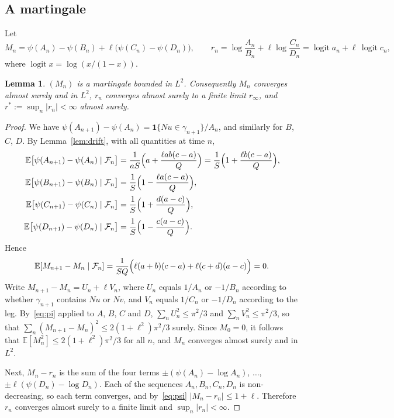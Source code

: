 \documentclass[11pt]{amsart}
\newtheorem{lemma}[theorem]{Lemma}
\theoremstyle{remark}
\newcommand{\EE}{\mathbb{E}}
\newcommand{\cF}{\mathcal{F}}
\newcommand{\one}{\mathbf{1}}
\newcommand{\logit}{\operatorname{logit}}
\begin{document}
\subsection{A martingale}\label{sec:mart}
Let
\[
M_n=\psi(A_n)-\psi(B_n)+\ell\bigl(\psi(C_n)-\psi(D_n)\bigr),\qquad
r_n=\log\frac{A_n}{B_n}+\ell\log\frac{C_n}{D_n}=\logit a_n+\ell\,\logit c_n,
\]
where $\logit x=\log(x/(1-x))$.

\begin{lemma}\label{lem:mart}
$(M_n)$ is a martingale bounded in $L^2$. Consequently $M_n$ converges almost surely and in $L^2$, $r_n$ converges
almost surely to a finite limit $r_\infty$, and $r^*:=\sup_n|r_n|<\infty$ almost surely.
\end{lemma}
\begin{proof}
We have $\psi(A_{n+1})-\psi(A_n)=\one\{Nu\in\gamma_{n+1}\}/A_n$, and similarly for $B$, $C$, $D$. By
Lemma~\ref{lem:drift}, with all quantities at time $n$,
\begin{align*}
\EE\bigl[\psi(A_{n+1})-\psi(A_n)\mid\cF_n\bigr]&=\frac{1}{aS}\Bigl(a+\frac{\ell ab(c-a)}{Q}\Bigr)
=\frac1S\Bigl(1+\frac{\ell b(c-a)}{Q}\Bigr),\\
\EE\bigl[\psi(B_{n+1})-\psi(B_n)\mid\cF_n\bigr]&=\frac1S\Bigl(1-\frac{\ell a(c-a)}{Q}\Bigr),\\
\EE\bigl[\psi(C_{n+1})-\psi(C_n)\mid\cF_n\bigr]&=\frac1S\Bigl(1+\frac{d(a-c)}{Q}\Bigr),\\
\EE\bigl[\psi(D_{n+1})-\psi(D_n)\mid\cF_n\bigr]&=\frac1S\Bigl(1-\frac{c(a-c)}{Q}\Bigr).
\end{align*}
Hence
\[
\EE[M_{n+1}-M_n\mid\cF_n]=\frac{1}{SQ}\Bigl(\ell(a+b)(c-a)+\ell(c+d)(a-c)\Bigr)=0 .
\]
Write $M_{n+1}-M_n=U_n+\ell V_n$, where $U_n$ equals $1/A_n$ or $-1/B_n$ according to whether $\gamma_{n+1}$ contains
$Nu$ or $Nv$, and $V_n$ equals $1/C_n$ or $-1/D_n$ according to the leg. By~\eqref{eq:pi} applied to $A$, $B$, $C$ and
$D$, $\sum_nU_n^2\le\pi^2/3$ and $\sum_nV_n^2\le\pi^2/3$, so that $\sum_n(M_{n+1}-M_n)^2\le2(1+\ell^2)\pi^2/3$ surely.
Since $M_0=0$, it follows that $\EE[M_n^2]\le2(1+\ell^2)\pi^2/3$ for all $n$, and $M_n$ converges almost surely and in
$L^2$.

Next, $M_n-r_n$ is the sum of the four terms $\pm(\psi(A_n)-\log A_n)$, $\dots$, $\pm\ell(\psi(D_n)-\log D_n)$. Each
of the sequences $A_n,B_n,C_n,D_n$ is non-decreasing, so each term converges, and by~\eqref{eq:psi}
$|M_n-r_n|\le1+\ell$. Therefore $r_n$ converges almost surely to a finite limit and $\sup_n|r_n|<\infty$.
\end{proof}
\end{document}
